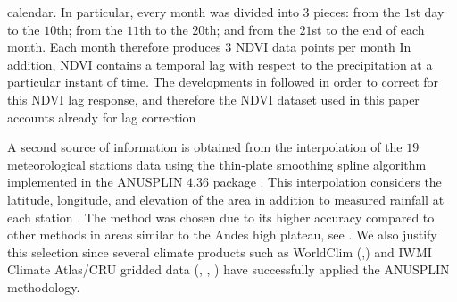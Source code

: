 {{calendar. In particular,} every month was divided into $3$ pieces: from the $1$st day to the $10$th; from the $11$th to the $20$th; and from the $21$st to the end of each month. Each month therefore produces $3$ NDVI data points per month   In addition, NDVI contains a temporal lag with respect to the precipitation at a particular instant of time.  The developments in  followed in order to correct for this NDVI lag response, and therefore the NDVI dataset used in this paper accounts already for lag correction   



A second source of information is obtained from the interpolation of the $19$ meteorological stations data using the thin-plate smoothing spline algorithm implemented in the ANUSPLIN $4.36$ package  \citep{Hutchinson_2006,ANUSP_07}. This interpolation considers the latitude, longitude, and elevation of the area in addition to measured rainfall at each station \citep{Hutchinson_95}. The method was chosen due to its higher accuracy compared to other methods in areas similar to the Andes high plateau, see 
\citet{Hijmans-et-al_2005,Hartkamp-et-al_99,Jarvis-Stuart_2001, 
Price-et-al_2000}. We also justify this selection since  several climate products such as WorldClim (\citep{Hijmans-et-al_2005},\citep{worldclim}) and IWMI Climate 
Atlas/CRU gridded data (\citep{New-et-al_2002}, \citep{IWMI}, 
\citep{UEACRU}) have successfully applied the ANUSPLIN methodology. 

}
